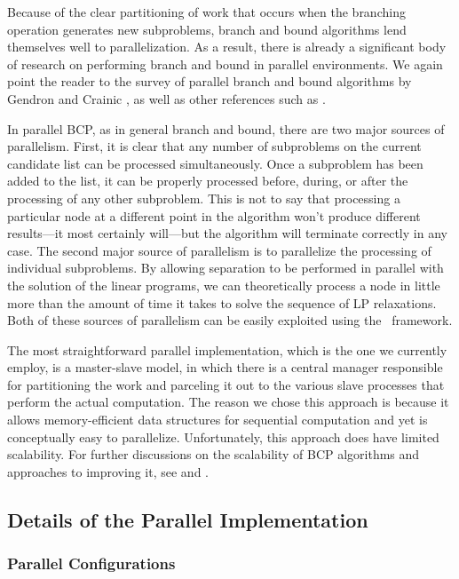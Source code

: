 Because of the clear partitioning of work that occurs when the
branching operation generates new subproblems, branch and bound
algorithms lend themselves well to parallelization. As a result, there
is already a significant body of research on performing branch and
bound in parallel environments. We again point the reader to the
survey of parallel branch and bound algorithms by Gendron and Crainic
\cite{G&C}, as well as other references such as \cite{PICO, G&K, R&K, K&R}.

In parallel BCP, as in general branch and bound, there are two major
sources of parallelism. First, it is clear that any number of
subproblems on the current candidate list can be processed
simultaneously. Once a subproblem has been added to the list, it can
be properly processed before, during, or after the processing of any
other subproblem. This is not to say that processing a particular node
at a different point in the algorithm won't produce different
results---it most certainly will---but the algorithm will terminate
correctly in any case. The second major source of parallelism is to
parallelize the processing of individual subproblems. By allowing
separation to be performed in parallel with the solution of the linear
programs, we can theoretically process a node in little more than the
amount of time it takes to solve the sequence of LP relaxations. Both
of these sources of parallelism can be easily exploited using the
\BB\ framework.

The most straightforward parallel implementation, which is the one we
currently employ, is a master-slave model, in which there is a central
manager responsible for partitioning the work and parceling it out to
the various slave processes that perform the actual computation. The
reason we chose this approach is because it allows memory-efficient
data structures for sequential computation and yet is conceptually
easy to parallelize. Unfortunately, this approach does have limited
scalability. For further discussions on the scalability of BCP algorithms and
approaches to improving it, see \cite{symphony1} and \cite{ALPS}.

\subsection{Details of the Parallel Implementation}

\subsubsection{Parallel Configurations}

